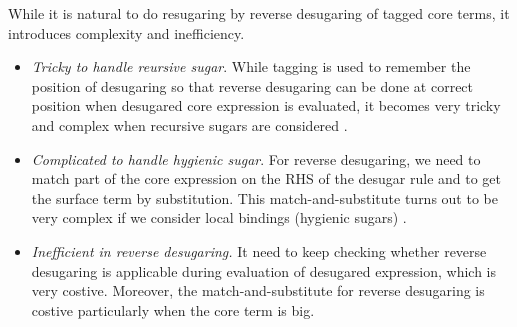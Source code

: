 While it is natural to do resugaring by reverse desugaring of tagged core terms, it introduces complexity and inefficiency.
\begin{itemize}
\item {\em Tricky to handle reursive sugar}. While tagging is used to remember the position of desugaring so that reverse desugaring can be done at correct position when desugared core expression is evaluated, it  becomes very tricky and complex when recursive sugars are considered \cite{resugaring}.

\item {\em Complicated to handle hygienic sugar}. For reverse desugaring, we need to match part of the core expression on the RHS of the desugar rule and to get the surface term by substitution. This match-and-substitute turns out to be very complex if we consider local bindings (hygienic sugars) \cite{hygienic}.

\item {\em Inefficient in reverse desugaring.} It need to keep checking whether reverse desugaring is applicable during evaluation of desugared expression, which is very costive. Moreover, the match-and-substitute for reverse desugaring is costive particularly when the core term is big.

\end{itemize}

